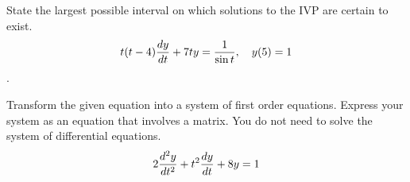 \documentclass[12pt]{exam}
\begin{document}
\begin{questions}
    
    \newpage \InitialsLeft
    
    \question[2] %
    State the largest possible interval on which solutions to the IVP are certain to exist. $$t(t-4) {\frac{dy}{dt}} + 7t y = \frac{1}{\sin t}, \quad y(5) = 1$$.    \vspace{5cm}
    
    
    \question[3] %
    Transform the given equation into a system of first order equations. Express your system as an equation that involves a matrix. You do not need to solve the system of differential equations. 
    $$2{\frac{d ^2y}{dt^2}} + t^2{\frac{dy}{dt}} +8y = 1$$
    
    \vspace{3cm}
    


\end{questions}
\end{document}
